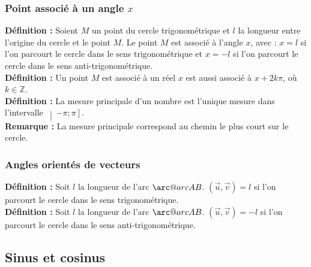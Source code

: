 \documentclass[a4paper,titlepage]{article}
\makeatletter
\newcommand{\arc@char}{{\usefont{U}{tipa}{m}{n}\symbol{62}}}%
\newcommand{\arc}[1]{\mathpalette\arc@arc{#1}}
\newcommand{\arc@arc}[2]{
    \sbox0{$\m@th#1#2$}
    \vbox{
        \hbox{\resizebox{\wd0}{\height}{\arc@char}}
        \nointerlineskip
        \box0
    }
}
\makeatother
\begin{document}
        \subsubsection[Point associé à un angle $x$]{\boldmath Point associé à un angle $x$}
            \textbf{Définition :} Soient $M$ un point du cercle trigonométrique et $l$ la longueur entre l’origine du cercle et le point $M$. Le point $M$ est associé à l’angle $x$, avec : $x=l$ si l’on parcourt le cercle dans le sens trigonométrique et $x=-l$ si l’on parcourt le cercle dans le sens anti-trigonométrique.
            \\
            \textbf{Définition :} Un point $M$ est associé à un réel $x$ est aussi associé à $x+2k\pi$, où $k\in\mathbb{Z}$.
            \\
            \textbf{Définition :} La mesure principale d’un nombre est l’unique mesure dans l'intervalle $\left]-\pi;\pi\right]$.
            \\
            \textbf{Remarque :} La mesure principale correspond au chemin le plus court sur le cercle.
        \subsubsection{Angles orientés de vecteurs}
            \textbf{Définition :} Soit $l$ la longueur de l’arc $\arc{AB}$. $\left(\vec{u},\vec{v}\right)=l$ si l’on parcourt le cercle dans le sens trigonométrique.
            \\
            \textbf{Définition :} Soit $l$ la longueur de l’arc $\arc{AB}$. $\left(\vec{u},\vec{v}\right)=-l$ si l’on parcourt le cercle dans le sens anti-trigonométrique.
    \subsection{Sinus et cosinus}
\end{document}
